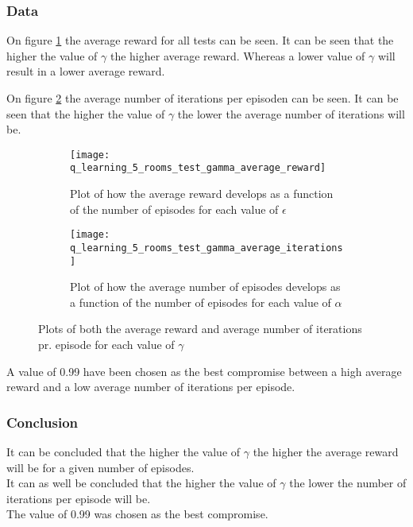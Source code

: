 \documentclass[../Head/Main.tex]{subfiles}
\begin{document}
\clearpage
\subsubsection{Data}
On figure \ref{fig:q-learn_gamma_reward} the average reward for all tests can be seen. It can be seen that the higher the value of $\gamma$ the higher average reward. Whereas a lower value of $\gamma$ will result in a lower average reward.\par
On figure \ref{fig:q-learn_gamma_iterations} the average number of iterations per episoden can be seen. It can be seen that the higher the value of $\gamma$ the lower the average number of iterations will be.
\begin{figure}[H]
	\centering
	\begin{subfigure}[b]{0.49\textwidth}
		\centering
		\texttt{[image: q\_learning\_5\_rooms\_test\_gamma\_average\_reward]}
		\caption{Plot of how the average reward develops as a function of the number of episodes for each value of $\epsilon$}
		\label{fig:q-learn_gamma_reward}
	\end{subfigure}
	\hfill
	\begin{subfigure}[b]{0.49\textwidth}
		\centering
		\texttt{[image: q\_learning\_5\_rooms\_test\_gamma\_average\_iterations]}
		\caption{Plot of how the average number of episodes develops as a function of the number of episodes for each value of $\alpha$}
		\label{fig:q-learn_gamma_iterations}
	\end{subfigure}
	\caption{Plots of both the average reward and average number of iterations pr. episode for each value of $\gamma$}
	\label{fig:q-learn_gamma}
\end{figure}
A value of 0.99 have been chosen as the best compromise between a high average reward and a low average number of iterations per episode.

\subsubsection{Conclusion}
It can be concluded that the higher the value of $\gamma$ the higher the average reward will be for a given number of episodes.\\
It can as well be concluded that the higher the value of $\gamma$ the lower the number of iterations per episode will be.\\ 
The value of 0.99 was chosen as the best compromise.
\end{document}
